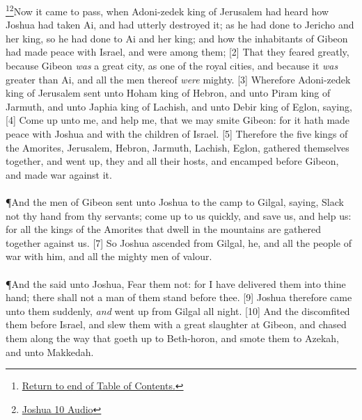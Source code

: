\footnote{\textcolor[cmyk]{0.99998,1,0,0}{\hyperlink{TOC}{Return to end of Table of Contents.}}}\footnote{\href{https://audiobible.com/bible/joshua_10.html}{\textcolor[cmyk]{0.99998,1,0,0}{Joshua 10 Audio}}}\textcolor[cmyk]{0.99998,1,0,0}{Now it came to pass, when Adoni-zedek king of Jerusalem had heard how Joshua had taken Ai, and had utterly destroyed it; as he had done to Jericho and her king, so he had done to Ai and her king; and how the inhabitants of Gibeon had made peace with Israel, and were among them;}
[2] \textcolor[cmyk]{0.99998,1,0,0}{That they feared greatly, because Gibeon \emph{was} a great city, as one of the royal cities, and because it \emph{was} greater than Ai, and all the men thereof \emph{were} mighty.}
[3] \textcolor[cmyk]{0.99998,1,0,0}{Wherefore Adoni-zedek king of Jerusalem sent unto Hoham king of Hebron, and unto Piram king of Jarmuth, and unto Japhia king of Lachish, and unto Debir king of Eglon, saying,}
[4] \textcolor[cmyk]{0.99998,1,0,0}{Come up unto me, and help me, that we may smite Gibeon: for it hath made peace with Joshua and with the children of Israel.}
[5] \textcolor[cmyk]{0.99998,1,0,0}{Therefore the five kings of the Amorites,  Jerusalem,  Hebron,  Jarmuth,  Lachish,  Eglon, gathered themselves together, and went up, they and all their hosts, and encamped before Gibeon, and made war against it.}\\
\\
\P \textcolor[cmyk]{0.99998,1,0,0}{And the men of Gibeon sent unto Joshua to the camp to Gilgal, saying, Slack not thy hand from thy servants; come up to us quickly, and save us, and help us: for all the kings of the Amorites that dwell in the mountains are gathered together against us.}
[7] \textcolor[cmyk]{0.99998,1,0,0}{So Joshua ascended from Gilgal, he, and all the people of war with him, and all the mighty men of valour.}\\
\\
\P \textcolor[cmyk]{0.99998,1,0,0}{And the  said unto Joshua, Fear them not: for I have delivered them into thine hand; there shall not a man of them stand before thee.}
[9] \textcolor[cmyk]{0.99998,1,0,0}{Joshua therefore came unto them suddenly, \emph{and} went up from Gilgal all night.}
[10] \textcolor[cmyk]{0.99998,1,0,0}{And the  discomfited them before Israel, and slew them with a great slaughter at Gibeon, and chased them along the way that goeth up to Beth-horon, and smote them to Azekah, and unto Makkedah.}
